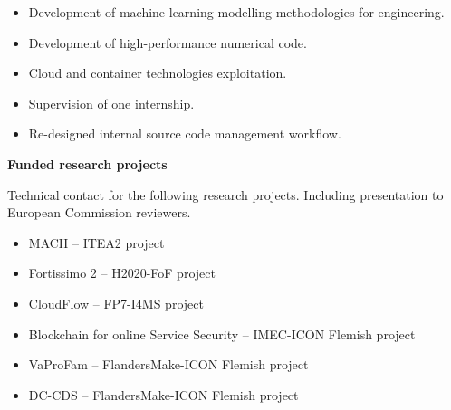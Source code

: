 \documentclass[10pt,a4paper]{altacv}
\newcommand{\cvaccentpar}[1]{%
  \smallskip%
  \textbf{\color{accent}#1}\par
  \medskip
}
\begin{document}
\begin{itemize}
\item Development of machine learning modelling methodologies for engineering.
\item Development of high-performance numerical code.
\item Cloud and container technologies exploitation.
\item Supervision of one internship.
\item Re-designed internal source code management workflow.
\end{itemize}


\cvaccentpar{Funded research projects}
Technical contact for the following research projects. Including presentation to European Commission reviewers.
\smallskip
\begin{itemize}
  \item MACH -- ITEA2 project
\item Fortissimo 2 -- H2020-FoF project
\item CloudFlow -- FP7-I4MS project
\item Blockchain for online Service Security -- IMEC-ICON Flemish project
\item VaProFam -- FlandersMake-ICON Flemish project
\item DC-CDS -- FlandersMake-ICON Flemish project
\end{itemize}

%
%
%
\end{document}
